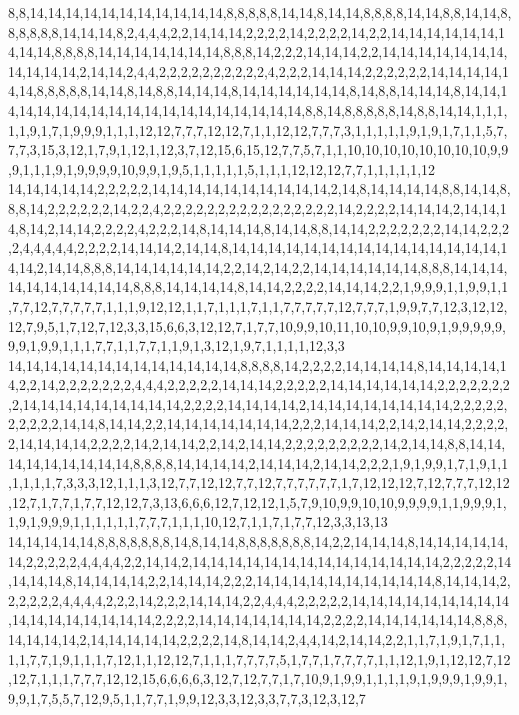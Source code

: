 8,8,14,14,14,14,14,14,14,14,14,14,14,8,8,8,8,8,14,14,8,14,14,8,8,8,8,14,14,8,8,14,14,8,8,8,8,8,8,14,14,14,8,2,4,4,4,2,2,14,14,14,2,2,2,2,14,2,2,2,2,14,2,2,14,14,14,14,14,14,14,14,14,8,8,8,8,14,14,14,14,14,14,14,8,8,8,14,2,2,2,14,14,14,2,2,14,14,14,14,14,14,14,14,14,14,14,2,14,14,2,4,4,2,2,2,2,2,2,2,2,2,2,4,2,2,2,14,14,14,2,2,2,2,2,2,14,14,14,14,14,14,8,8,8,8,8,14,14,8,14,8,8,14,14,14,8,14,14,14,14,14,14,8,14,8,8,14,14,14,8,14,14,14,14,14,14,14,14,14,14,14,14,14,14,14,14,14,14,14,8,8,14,8,8,8,8,8,14,8,8,14,14,1,1,1,1,1,9,1,7,1,9,9,9,1,1,1,12,12,7,7,7,12,12,7,1,1,12,12,7,7,7,3,1,1,1,1,1,9,1,9,1,7,1,1,5,7,7,7,3,15,3,12,1,7,9,1,12,1,12,3,7,12,15,6,15,12,7,7,5,7,1,1,10,10,10,10,10,10,10,10,9,9,9,1,1,1,9,1,9,9,9,9,10,9,9,1,9,5,1,1,1,1,1,5,1,1,1,12,12,12,7,7,1,1,1,1,1,12
14,14,14,14,14,2,2,2,2,2,14,14,14,14,14,14,14,14,14,14,2,14,8,14,14,14,14,8,8,14,14,8,8,8,14,2,2,2,2,2,2,14,2,2,4,2,2,2,2,2,2,2,2,2,2,2,2,2,2,2,2,14,2,2,2,2,14,14,14,2,14,14,14,8,14,2,14,14,2,2,2,2,4,2,2,2,14,8,14,14,14,8,14,14,8,8,14,14,2,2,2,2,2,2,2,14,14,2,2,2,2,4,4,4,4,4,2,2,2,2,14,14,14,2,14,14,8,14,14,14,14,14,14,14,14,14,14,14,14,14,14,14,14,14,2,14,14,8,8,8,14,14,14,14,14,14,2,2,14,2,14,2,2,14,14,14,14,14,14,8,8,8,14,14,14,14,14,14,14,14,14,14,8,8,8,14,14,14,14,8,14,14,2,2,2,2,14,14,14,2,2,1,9,9,9,1,1,9,9,1,1,7,7,12,7,7,7,7,7,1,1,1,9,12,12,1,1,7,1,1,1,7,1,1,7,7,7,7,7,12,7,7,7,1,9,9,7,7,12,3,12,12,12,7,9,5,1,7,12,7,12,3,3,15,6,6,3,12,12,7,1,7,7,10,9,9,10,11,10,10,9,9,10,9,1,9,9,9,9,9,9,9,1,9,9,1,1,1,7,7,1,1,7,7,1,1,9,1,3,12,1,9,7,1,1,1,1,12,3,3
14,14,14,14,14,14,14,14,14,14,14,14,14,8,8,8,8,14,2,2,2,2,14,14,14,14,8,14,14,14,14,14,2,2,14,2,2,2,2,2,2,2,4,4,4,2,2,2,2,2,14,14,14,2,2,2,2,2,14,14,14,14,14,14,2,2,2,2,2,2,2,2,14,14,14,14,14,14,14,14,14,2,2,2,2,14,14,14,14,2,14,14,14,14,14,14,14,14,2,2,2,2,2,2,2,2,2,2,14,14,8,14,14,2,2,14,14,14,14,14,14,14,2,2,2,14,14,14,2,2,14,2,14,14,2,2,2,2,2,14,14,14,14,2,2,2,2,14,2,14,14,2,2,14,2,14,14,2,2,2,2,2,2,2,2,2,14,2,14,14,8,8,14,14,14,14,14,14,14,14,14,8,8,8,8,14,14,14,14,2,14,14,14,2,14,14,2,2,2,1,9,1,9,9,1,7,1,9,1,1,1,1,1,1,7,3,3,3,12,1,1,1,3,12,7,7,12,12,7,7,12,7,7,7,7,7,7,1,7,12,12,12,7,12,7,7,7,12,12,12,7,1,7,7,1,7,7,12,12,7,3,13,6,6,6,12,7,12,12,1,5,7,9,10,9,9,10,10,9,9,9,9,1,1,9,9,9,1,1,9,1,9,9,9,1,1,1,1,1,1,7,7,7,1,1,1,10,12,7,1,1,7,1,7,7,12,3,3,13,13
14,14,14,14,14,8,8,8,8,8,8,8,14,8,14,14,8,8,8,8,8,8,8,14,2,2,14,14,14,8,14,14,14,14,14,14,2,2,2,2,2,4,4,4,4,2,2,14,14,2,14,14,14,14,14,14,14,14,14,14,14,14,14,14,2,2,2,2,2,14,14,14,14,8,14,14,14,14,2,2,14,14,14,2,2,2,14,14,14,14,14,14,14,14,14,14,8,14,14,14,2,2,2,2,2,2,4,4,4,4,2,2,2,14,2,2,2,14,14,14,2,2,4,4,4,2,2,2,2,2,14,14,14,14,14,14,14,14,14,14,14,14,14,14,14,14,14,2,2,2,2,14,14,14,14,14,14,14,2,2,2,2,14,14,14,14,14,14,8,8,8,14,14,14,14,2,14,14,14,14,14,2,2,2,2,14,8,14,14,2,4,4,14,2,14,14,2,2,1,1,7,1,9,1,7,1,1,1,1,7,7,1,9,1,1,1,7,12,1,1,12,12,7,1,1,1,7,7,7,7,5,1,7,7,1,7,7,7,7,1,1,12,1,9,1,12,12,7,12,12,7,1,1,1,7,7,7,12,12,15,6,6,6,6,3,12,7,12,7,7,1,7,10,9,1,9,9,1,1,1,1,9,1,9,9,9,1,9,9,1,9,9,1,7,5,5,7,12,9,5,1,1,7,7,1,9,9,12,3,3,12,3,3,7,7,3,12,3,12,7
